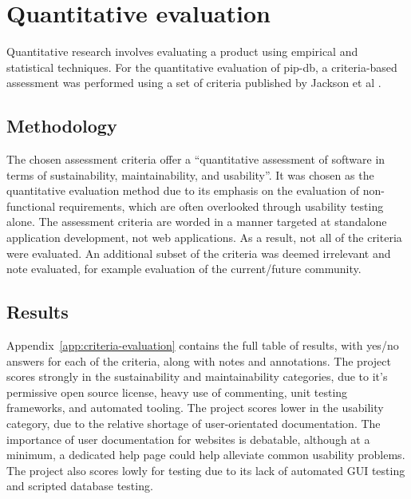 \section{Quantitative evaluation}\label{sec:quantitative-evaluation}

Quantitative research involves evaluating a product using empirical
and statistical techniques. For the quantitative evaluation of pip-db,
a criteria-based assessment was performed using a set of criteria
published by Jackson et al \cite{jackson2011evaluation}.


\subsection{Methodology}

The chosen assessment criteria offer a ``quantitative assessment of
software in terms of sustainability, maintainability, and
usability''. It was chosen as the quantitative evaluation method due
to its emphasis on the evaluation of non-functional requirements,
which are often overlooked through usability testing alone. The
assessment criteria are worded in a manner targeted at standalone
application development, not web applications. As a result, not all of
the criteria were evaluated. An additional subset of the criteria was
deemed irrelevant and note evaluated, for example evaluation of the
current/future community.

\subsection{Results}

Appendix~\ref{app:criteria-evaluation} contains the full table of
results, with yes/no answers for each of the criteria, along with
notes and annotations. The project scores strongly in the
sustainability and maintainability categories, due to it's permissive
open source license, heavy use of commenting, unit testing frameworks,
and automated tooling. The project scores lower in the usability
category, due to the relative shortage of user-orientated
documentation. The importance of user documentation for websites is
debatable, although at a minimum, a dedicated help page could help
alleviate common usability problems. The project also scores lowly for
testing due to its lack of automated GUI testing and scripted database
testing.

